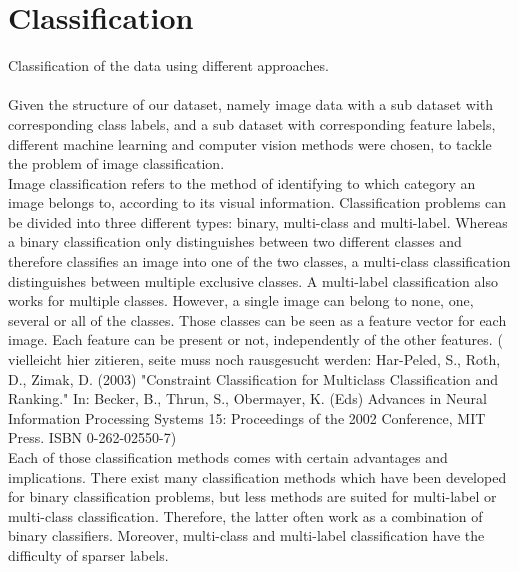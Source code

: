 \section{Classification}

Classification of the data using different approaches. \\

\\

Given the structure of our dataset, namely image data with a sub dataset with corresponding class labels, and a sub dataset with corresponding feature labels, different machine learning and computer vision methods were chosen, to tackle the problem of image classification. \\

Image classification refers to the method of identifying to which category an image belongs to, according to its visual information.  Classification problems can be divided into three different types: binary, multi-class and multi-label. Whereas a binary classification only distinguishes between two different classes and therefore classifies an image into one of the two classes, a multi-class classification distinguishes between multiple exclusive classes. A multi-label classification also works for multiple classes. However, a single image can belong to none, one, several or all of the classes. Those classes can be seen as a feature vector for each image. Each feature can be present or not, independently of the other features. ( vielleicht hier zitieren, seite muss noch rausgesucht werden: Har-Peled, S., Roth, D., Zimak, D. (2003) "Constraint Classification for Multiclass Classification and Ranking." In: Becker, B., Thrun, S., Obermayer, K. (Eds) Advances in Neural Information Processing Systems 15: Proceedings of the 2002 Conference, MIT Press. ISBN 0-262-02550-7) \\

Each of those classification methods comes with certain advantages and implications.
There exist many classification methods which have been developed for binary classification problems, but less methods are suited for multi-label or multi-class classification. Therefore, the latter often work as a combination of binary classifiers. Moreover, multi-class and multi-label classification have the difficulty of sparser labels. \\

